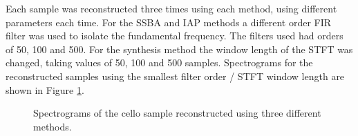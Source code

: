 		Each sample was reconstructed three times using each method, using different parameters each time. For the
		SSBA and IAP methods a different order FIR filter was used to isolate the fundamental frequency. The
		filters used had orders of 50, 100 and 500. For the synthesis method the window length of the STFT was
		changed, taking values of 50, 100 and 500 samples. Spectrograms for the reconstructed samples using the
		smallest filter order / STFT window length are shown in Figure \ref{fig:ReconstructedCelloSpectrograms}.

		\begin{figure}[h!]
			\centering
			\qquad
			
			\caption{Spectrograms of the cello sample reconstructed using three different methods.}
			\label{fig:ReconstructedCelloSpectrograms}
		\end{figure}

